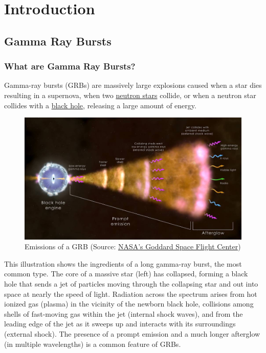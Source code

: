 \documentclass[11pt]{book} %
\begin{document}

\chapter{Introduction}
\section{Gamma Ray Bursts}
\subsection{What are Gamma Ray Bursts?}
Gamma-ray bursts (GRBs) are massively large explosions caused when a star dies resulting in a supernova, when two \href{https://en.wikipedia.org/wiki/Neutron_star}{neutron stars} collide, or when a neutron star collides with a \href{https://en.wikipedia.org/wiki/Black_hole}{black hole}, releasing a large amount of energy.  

\begin{figure}[H]
\centering
    \includegraphics[scale=0.43]{Pictures/grb_shell_final_0.jpg}
    \caption{Emissions of a GRB (Source: \href{https://www.nasa.gov/feature/goddard/2023/nasa-missions-study-what-may-be-a-1-in-10000-year-gamma-ray-burst}{NASA's Goddard Space Flight Center})}
\end{figure}

This illustration shows the ingredients of a long gamma-ray burst, the most common type. The core of a massive star (left) has collapsed, forming a black hole that sends a jet of particles moving through the collapsing star and out into space at nearly the speed of light. Radiation across the spectrum arises from hot ionized gas (plasma) in the vicinity of the newborn black hole, collisions among shells of fast-moving gas within the jet (internal shock waves), and from the leading edge of the jet as it sweeps up and interacts with its surroundings (external shock). The presence of a prompt emission and a much longer afterglow (in multiple wavelengths) is a common feature of GRBs.
\end{document}
